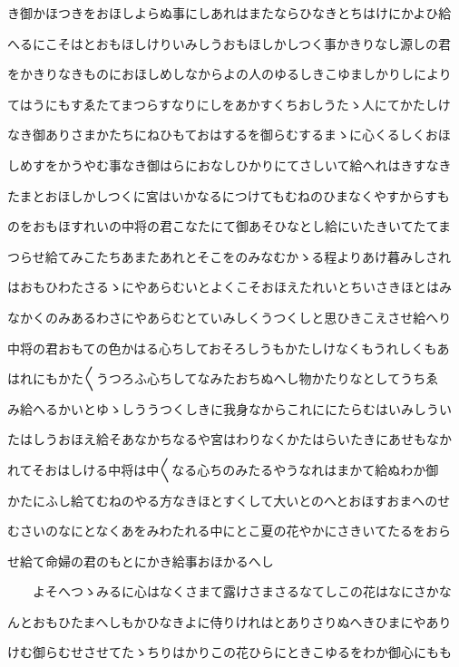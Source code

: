 \documentclass[a4paper,11pt,landscape]{ltjtarticle}
\begin{document}
き御かほつきをおほしよらぬ事にしあれはまたならひなきとちはけにかよひ給
\par\medskip
へるにこそはとおもほしけりいみしうおもほしかしつく事かきりなし源しの君
\par\medskip
をかきりなきものにおほしめしなからよの人のゆるしきこゆましかりしにより
\par\medskip
てはうにもすゑたてまつらすなりにしをあかすくちおしうたゝ人にてかたしけ
\par\medskip
なき御ありさまかたちにねひもておはするを御らむするまゝに心くるしくおほ
\par\medskip
しめすをかうやむ事なき御はらにおなしひかりにてさしいて給へれはきすなき
\par\medskip
たまとおほしかしつくに宮はいかなるにつけてもむねのひまなくやすからすも
\par\medskip
のをおもほすれいの中将の君こなたにて御あそひなとし給にいたきいてたてま
\par\medskip
つらせ給てみこたちあまたあれとそこをのみなむかゝる程よりあけ暮みしされ
\par\medskip
はおもひわたさるゝにやあらむいとよくこそおほえたれいとちいさきほとはみ
\par\medskip
なかくのみあるわさにやあらむとていみしくうつくしと思ひきこえさせ給へり
\par\medskip
中将の君おもての色かはる心ちしておそろしうもかたしけなくもうれしくもあ
\par\medskip
はれにもかた〱うつろふ心ちしてなみたおちぬへし物かたりなとしてうちゑ
\par\medskip
み給へるかいとゆゝしううつくしきに我身なからこれににたらむはいみしうい
\par\medskip
たはしうおほえ給そあなかちなるや宮はわりなくかたはらいたきにあせもなか
\par\medskip
れてそおはしける中将は中〱なる心ちのみたるやうなれはまかて給ぬわか御
\par\medskip
かたにふし給てむねのやる方なきほとすくして大いとのへとおほすおまへのせ
\par\medskip
むさいのなにとなくあをみわたれる中にとこ夏の花やかにさきいてたるをおら
\par\medskip
せ給て命婦の君のもとにかき給事おほかるへし
\par\medskip
　　よそへつゝみるに心はなくさまて露けさまさるなてしこの花はなにさかな
\par\medskip
んとおもひたまへしもかひなきよに侍りけれはとありさりぬへきひまにやあり
\par\medskip
けむ御らむせさせてたゝちりはかりこの花ひらにときこゆるをわか御心にもも
\end{document}
